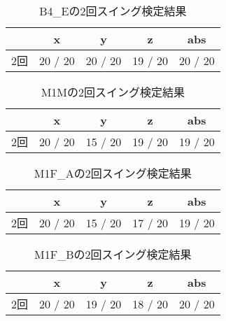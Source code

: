         \begin{table}[tb]
            \caption{B4_Eの2回スイング検定結果}
            \vspace{0.5cm}
            \centering
            \begin{tabular}{|c|c|c|c|c|}
                \hline
                \diagbox{}{} & x & y & z & abs \\\hline
                2回 & 20 / 20 & 20 / 20 & 19 / 20 & 20 / 20 \\
                \hline
            \end{tabular}
        \end{table}
        \begin{table}[tb]
            \caption{M1Mの2回スイング検定結果}
            \vspace{0.5cm}
            \centering
            \begin{tabular}{|c|c|c|c|c|}
                \hline
                \diagbox{}{} & x & y & z & abs \\\hline
                2回 & 20 / 20 & 15 / 20 & 19 / 20 & 19 / 20 \\
                \hline
            \end{tabular}
        \end{table}
        \begin{table}[tb]
            \caption{M1F_Aの2回スイング検定結果}
            \vspace{0.5cm}
            \centering
            \begin{tabular}{|c|c|c|c|c|}
                \hline
                \diagbox{}{} & x & y & z & abs \\\hline
                2回 & 20 / 20 & 15 / 20 & 17 / 20 & 19 / 20 \\
                \hline
            \end{tabular}
        \end{table}
        \begin{table}[tb]
            \caption{M1F_Bの2回スイング検定結果}
            \vspace{0.5cm}
            \centering
            \begin{tabular}{|c|c|c|c|c|}
                \hline
                \diagbox{}{} & x & y & z & abs \\\hline
                2回 & 20 / 20 & 19 / 20 & 18 / 20 & 20 / 20 \\
                \hline
            \end{tabular}
        \end{table}
